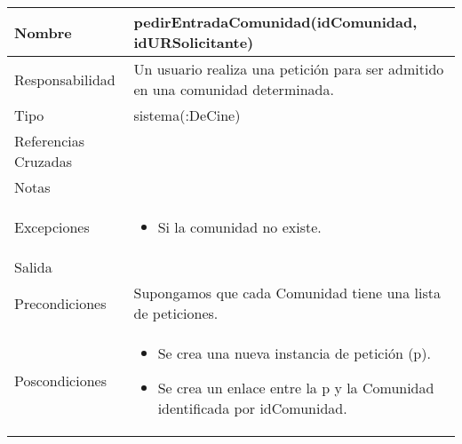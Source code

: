 \documentclass{article}
\begin{document}
\begin{table}[h]
\begin{tabular}{|l|l|l|l|l|l|}
\hline
\multicolumn{2}{|p{3cm}|}{Nombre} & \multicolumn{4}{p{10cm}|}{\textbf{pedirEntradaComunidad(idComunidad, idURSolicitante)}}\\
\hline
\multicolumn{2}{|p{3cm}|}{Responsabilidad} & \multicolumn{4}{p{10cm}|}{Un usuario realiza una petición para ser admitido en una comunidad determinada.} \\
\hline
\multicolumn{2}{|p{3cm}|}{Tipo} & \multicolumn{4}{p{10cm}|}{sistema(:DeCine)} \\
\hline
\multicolumn{2}{|p{3cm}|}{Referencias Cruzadas} & \multicolumn{4}{p{10cm}|}{} \\
\hline
\multicolumn{2}{|p{3cm}|}{Notas} & \multicolumn{4}{p{10cm}|}{} \\
\hline
\multicolumn{2}{|p{3cm}|}{Excepciones} & \multicolumn{4}{p{10cm}|}{\begin{itemize}
\item Si la comunidad no existe.
\end{itemize}} \\
\hline
\multicolumn{2}{|p{3cm}|}{Salida} & \multicolumn{4}{p{10cm}|}{} \\
\hline
\multicolumn{2}{|p{3cm}|}{Precondiciones} & \multicolumn{4}{p{10cm}|}{Supongamos que cada Comunidad tiene una lista de peticiones.} \\
\hline
\multicolumn{2}{|p{3cm}|}{Poscondiciones} & \multicolumn{4}{p{10cm}|}{\begin{itemize}
\item Se crea una nueva instancia de petición (p).
\item Se crea un enlace entre la p y la Comunidad identificada por idComunidad.
\end{itemize}} \\
\hline
\end{tabular}
\end{table}
\end{document}
